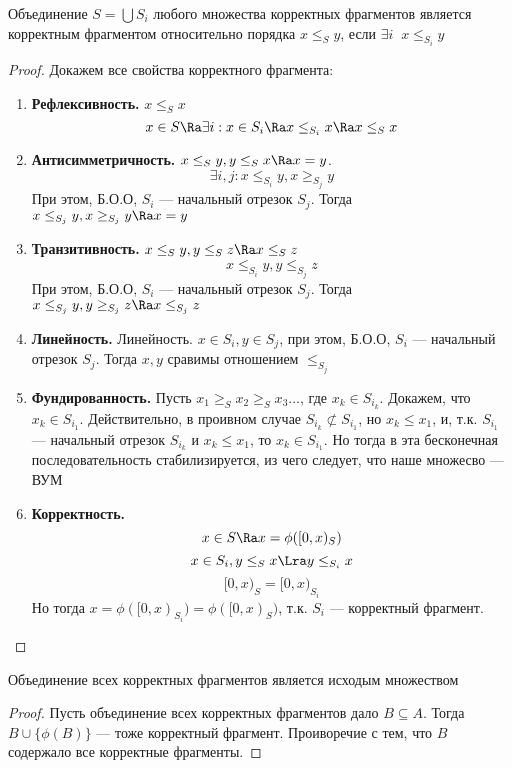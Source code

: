 \begin{lemma}
    Объединение \(S = \bigcup S_i\) любого множества корректных фрагментов является корректным фрагментом относительно порядка \(x \le_S y\), если \(\exists i\;\;x \le_{S_i} y\)
\end{lemma}
\begin{proof}
    Докажем все свойства корректного фрагмента:
    \begin{enumerate}
        \item \textbf{Рефлексивность.} \(x \le_S x\)
        \[x \in S \Ra \exists i: x \in S_i \Ra x \le_{S_i} x \Ra x \le_S x\]
        \item \textbf{Антисимметричность.} \(x \le_S y, y \le_S x \Ra x = y\).
        \[\exists i, j: x \le_{S_i} y, x \ge_{S_j} y\]
        При этом, Б.О.О, \(S_i\) --- начальный отрезок \(S_j\). Тогда \(x \le_{S_j} y, x \ge_{S_j} y \Ra x = y\)
        \item \textbf{Транзитивность.} \(x \le_S y, y \le_S z \Ra x \le_S z\)
        \[x \le_{S_i} y, y \le_{S_j} z\]
        При этом, Б.О.О, \(S_i\) --- начальный отрезок \(S_j\). Тогда \(x \le_{S_j} y, y \ge_{S_j} z \Ra x \le_{S_j} z\)
        \item \textbf{Линейность.} Линейность. \(x \in S_i, y \in S_j\), при этом, Б.О.О, \(S_i\) --- начальный отрезок \(S_j\). Тогда \(x, y\) сравимы отношением \(\le_{S_j}\)
        \item \textbf{Фундированность.} Пусть \(x_1 \ge_S x_2 \ge_S x_3 \dots\), где \(x_k \in S_{i_k}\). Докажем, что \(x_k \in S_{i_1}\). Действительно, в проивном случае \(S_{i_k} \not\subset S_{i_1}\), но \(x_k \le x_1\), и, т.к. \(S_{i_1}\) --- начальный отрезок \(S_{i_k}\) и \(x_k \le x_1\), то \(x_k \in S_{i_1}\). Но тогда в эта бесконечная последовательность стабилизируется, из чего следует, что наше множесво --- ВУМ
        \item \textbf{Корректность.}
        \[x \in S \Ra x = \phi([0, x)_S)\]
        \[x \in S_i, y \le_S x \Lra y \le_{S_i} x\]
        \[[0, x)_S = [0, x)_{S_i}\]
        Но тогда \(x = \phi([0, x)_{S_i}) = \phi([0, x)_S)\), т.к. \(S_i\) --- корректный фрагмент.
    \end{enumerate}
\end{proof}

\begin{lemma}
    Объединение всех корректных фрагментов является исходым множеством
\end{lemma}
\begin{proof}
    Пусть объединение всех корректных фрагментов дало \(B \subseteq A\). Тогда \(B \cup \{\phi(B)\}\) --- тоже корректный фрагмент. Проиворечие с тем, что \(B\) содержало все корректные фрагменты.
\end{proof}

